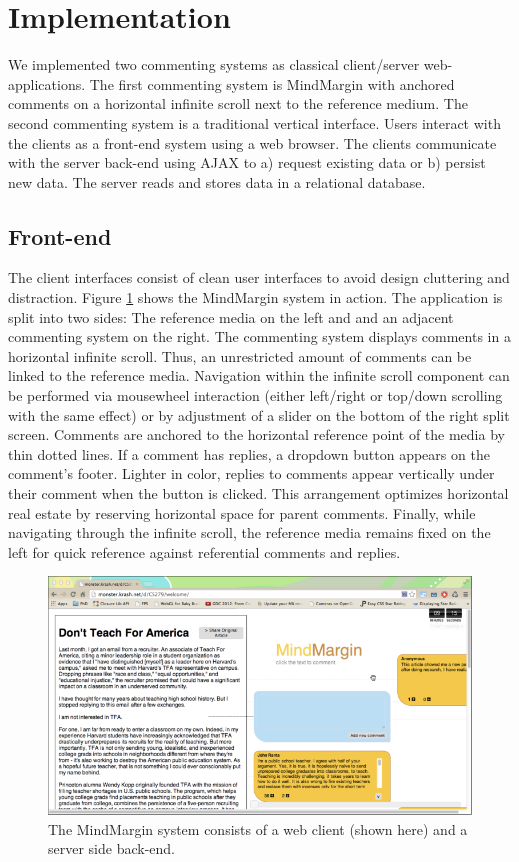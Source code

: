 \section {Implementation}

We implemented two commenting systems as classical client/server web-applications. The first commenting system is MindMargin with anchored comments on a horizontal infinite scroll next to the reference medium. The second commenting system is a traditional vertical interface. Users interact with the clients as a front-end system using a web browser. The clients communicate with the server back-end using AJAX to a) request existing data or b) persist new data. The server reads and stores data in a relational database.

\subsection{Front-end}
The client interfaces consist of clean user interfaces to avoid design cluttering and distraction. Figure \ref{fig:frontend} shows the MindMargin system in action. The application is split into two sides: The reference media on the left and and an adjacent commenting system on the right. The commenting system displays comments in a horizontal infinite scroll. Thus, an unrestricted amount of comments can be linked to the reference media. Navigation within the infinite scroll component can be performed via mousewheel interaction (either left/right or top/down scrolling with the same effect) or by adjustment of a slider on the bottom of the right split screen. Comments are anchored to the horizontal reference point of the media by thin dotted lines. If a comment has replies, a dropdown button appears on the comment's footer. Lighter in color, replies to comments appear vertically under their comment when the button is clicked. This arrangement optimizes horizontal real estate by reserving horizontal space for parent comments. Finally, while navigating through the infinite scroll, the reference media remains fixed on the left for quick reference against referential comments and replies.

\begin{figure}
\includegraphics[scale=0.3]{mindmargin.png} 
\caption{The MindMargin system consists of a web client (shown here) and a server side back-end.}
\label{fig:frontend}
\end{figure}

